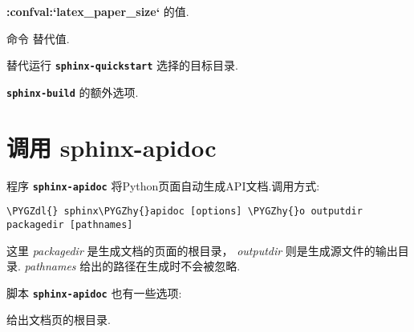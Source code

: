 \documentclass[letterpaper,10pt,english]{sphinxmanual}
\def\PYGZdl{\char`\$}
\def\PYGZhy{\char`\-}
\begin{document}
\begin{fulllineitems}
{\color{red}\bfseries{}:confval:{}`latex\_paper\_size{}`} 的值.

\end{fulllineitems}



\begin{fulllineitems}
命令  替代值.

\end{fulllineitems}



\begin{fulllineitems}
替代运行 \textbf{\texttt{sphinx-quickstart}} 选择的目标目录.

\end{fulllineitems}



\begin{fulllineitems}
\textbf{\texttt{sphinx-build}} 的额外选项.

\end{fulllineitems}



\chapter{调用 sphinx-apidoc}
\label{invocation:sphinx-apidoc}\label{invocation:invocation-apidoc}
程序 \textbf{\texttt{sphinx-apidoc}} 将Python页面自动生成API文档.调用方式:

\begin{Verbatim}[commandchars=\\\{\}]
\PYGZdl{} sphinx\PYGZhy{}apidoc [options] \PYGZhy{}o outputdir packagedir [pathnames]
\end{Verbatim}

这里 \emph{packagedir} 是生成文档的页面的根目录， \emph{outputdir} 则是生成源文件的输出目录.
\emph{pathnames} 给出的路径在生成时不会被忽略.

脚本 \textbf{\texttt{sphinx-apidoc}} 也有一些选项:

\begin{fulllineitems}
\label{invocation:cmdoption-sphinx-apidoc-o}
给出文档页的根目录.

\end{fulllineitems}
\end{document}
